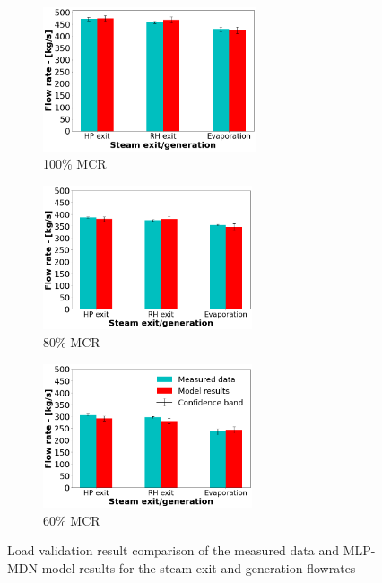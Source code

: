 \documentclass[a4paper,fleqn]{cas-dc}
\begin{document}
\begin{figure}
\centering
\begin{subfigure}{0.33\textwidth}
\includegraphics[width=\linewidth, height = 4.25cm]{100_CASE_STEAM}
        \caption{100\% MCR}
\end{subfigure}\hfill %
\begin{subfigure}{0.33\textwidth}
    \includegraphics[width=\linewidth, height = 4.25cm]{80_CASE_STEAM}
    \caption{80\% MCR}
\end{subfigure}\hfill
\begin{subfigure}{0.33\textwidth}
	\includegraphics[width=\linewidth, height = 4.25cm]{60_CASE_STEAM}
    \caption{60\% MCR}
\end{subfigure}
\caption{Load validation result comparison of the measured data and MLP-MDN model results for the steam exit and generation flowrates}
\label{fig_steam_gen}
\end{figure}
\end{document}
